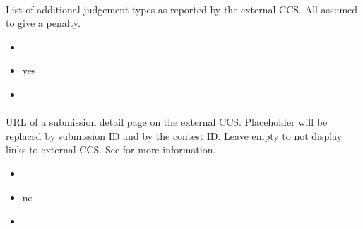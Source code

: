 \documentclass[a4paper,10pt,english,openany]{sphinxmanual}
\begin{document}
\paragraph{}
\label{\detokenize{configuration-reference:external-judgement-types}}
\sphinxAtStartPar
List of additional judgement types as reported by the external CCS. All assumed to give a penalty.
\begin{itemize}
\item {} 
\sphinxAtStartPar
{} 

\item {} 
\sphinxAtStartPar
{} yes

\item {} 
\sphinxAtStartPar
{}

\begin{sphinxVerbatim}[commandchars=\\\{\}]
\end{sphinxVerbatim}

\end{itemize}


\paragraph{}
\label{\detokenize{configuration-reference:external-ccs-submission-url}}
\sphinxAtStartPar
URL of a submission detail page on the external CCS. Placeholder \sphinxtitleref{{[}id{]}} will be replaced by submission ID and \sphinxtitleref{{[}contest{]}} by the contest ID. Leave empty to not display links to external CCS. See {\hyperref[\detokenize{shadow::doc}]{}} for more information.
\begin{itemize}
\item {} 
\sphinxAtStartPar
{} 

\item {} 
\sphinxAtStartPar
{} no

\item {} 
\sphinxAtStartPar
{} \sphinxcode{\sphinxupquote{\textquotesingle{}\textquotesingle{}}}

\end{itemize}
\end{document}
